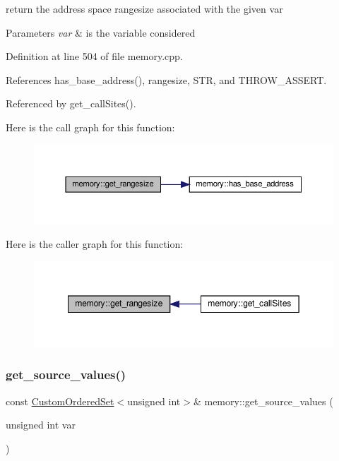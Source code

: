 return the address space rangesize associated with the given var 


\begin{DoxyParams}{Parameters}
{\em var} & is the variable considered \\
\hline
\end{DoxyParams}


Definition at line 504 of file memory.\+cpp.



References has\+\_\+base\+\_\+address(), rangesize, S\+TR, and T\+H\+R\+O\+W\+\_\+\+A\+S\+S\+E\+RT.



Referenced by get\+\_\+call\+Sites().

Here is the call graph for this function\+:
\nopagebreak
\begin{figure}[H]
\begin{center}
\leavevmode
\includegraphics[width=350pt]{d8/d99/classmemory_accb255d35a6b3e1d93b5f38b9459b52b_cgraph}
\end{center}
\end{figure}
Here is the caller graph for this function\+:
\nopagebreak
\begin{figure}[H]
\begin{center}
\leavevmode
\includegraphics[width=349pt]{d8/d99/classmemory_accb255d35a6b3e1d93b5f38b9459b52b_icgraph}
\end{center}
\end{figure}
\mbox{\label{classmemory_a8a53cddf47d035cb68621156d6ce45c4}} 
\subsubsection{\texorpdfstring{get\+\_\+source\+\_\+values()}{get\_source\_values()}}
{\footnotesize\ttfamily const \hyperlink{classCustomOrderedSet}{Custom\+Ordered\+Set}$<$unsigned int$>$\& memory\+::get\+\_\+source\+\_\+values (\begin{DoxyParamCaption}\item[{unsigned int}]{var }\end{DoxyParamCaption})\hspace{0.3cm}{\ttfamily [inline]}}




